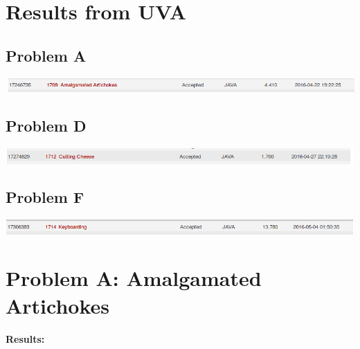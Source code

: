 \documentclass[12pt]{article}
\begin{document}

\newcommand{\hmwkClass}{COS 255}
\newcommand{\hmwkSemester}{Spring 2016}

\newcommand{\hmwkAuthorName}{Lukas Leung}
\newcommand{\hmwkAuthorID}{lleung}

\newcommand{\hmwkAssignmentNum}{9}

\newcommand{\hmwkProblemNum}{}

\newcommand{\hmwkCollaborators}{}
\thispagestyle{fancycollab}

\section*{Results from UVA}
\subsection{Problem A}
\includegraphics[width=\textwidth]{ProblemA}
\subsection{Problem D}
\includegraphics[width=\textwidth]{ProblemD}
\subsection{Problem F}
\includegraphics[width=\textwidth]{ProblemF}
\newpage


\section{Problem A: Amalgamated Artichokes}
\noindent \textbf{Results:} \\
\end{document}
